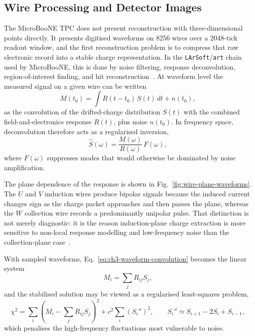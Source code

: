 \subsection{Wire Processing and Detector Images}
The MicroBooNE TPC does not present reconstruction with three-dimensional
points directly. It presents digitised waveforms on \num{8256} wires over a
\num{2048}-tick readout window, and the first reconstruction problem is to
compress that raw electronic record into a stable charge representation. In the
\texttt{LArSoft}/\texttt{art} chain used by MicroBooNE, this is done by noise
filtering, response deconvolution, region-of-interest finding, and hit
reconstruction~\cite{SniderPetrillo:2017LArSoft,ubnoise,ubsp1,ubsp2}. At
waveform level the measured signal on a given wire can be written
\begin{equation}
  M(t_0)=\int R(t-t_0)\,S(t)\,dt + n(t_0),
  \label{eq:ch3-waveform-convolution}
\end{equation}
as the convolution of the drifted-charge distribution \(S(t)\) with the
combined field-and-electronics response \(R(t)\), plus noise \(n(t_0)\). In
frequency space, deconvolution therefore acts as a regularised inversion,
\begin{equation}
  \hat{S}(\omega)=\frac{M(\omega)}{R(\omega)}\,F(\omega),
  \label{eq:ch3-fourier-deconvolution}
\end{equation}
where \(F(\omega)\) suppresses modes that would otherwise be dominated by noise
amplification.

The plane dependence of the response is shown in
Fig.~\ref{fig:wire-plane-waveforms}. The \(U\) and \(V\) induction wires
produce bipolar signals because the induced current changes sign as the charge
packet approaches and then passes the plane, whereas the \(W\) collection wire
records a predominantly unipolar pulse. That distinction is not merely
diagnostic: it is the reason induction-plane charge extraction is more
sensitive to non-local response modelling and low-frequency noise than the
collection-plane case~\cite{ubsp1,ubsp2,ubnoise}.



With sampled waveforms, Eq.~\eqref{eq:ch3-waveform-convolution} becomes the
linear system
\begin{equation}
  M_i=\sum_j R_{ij}S_j,
  \label{eq:ch3-discrete-convolution}
\end{equation}
and the stabilised solution may be viewed as a regularised least-squares
problem,
\begin{equation}
  \chi^2
  =
  \sum_i\left(M_i-\sum_j R_{ij}S_j\right)^2
  + c^2\sum_i (S_i'')^2,
  \qquad
  S_i''\simeq S_{i+1}-2S_i+S_{i-1},
  \label{eq:ch3-regularised-inversion}
\end{equation}
which penalises the high-frequency fluctuations most vulnerable to noise.

